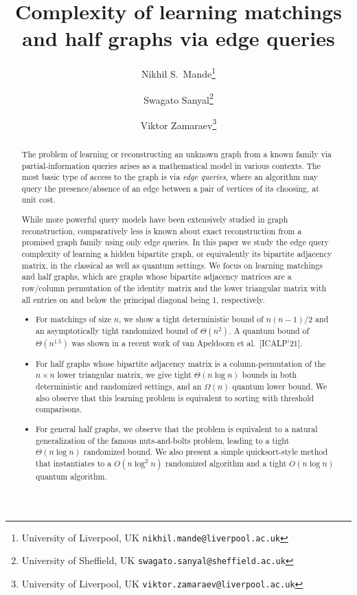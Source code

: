 \documentclass[11pt]{article}
\title{Complexity of learning matchings and half graphs via edge queries}
\author{Nikhil S.~Mande\thanks{University of Liverpool, UK {\tt nikhil.mande@liverpool.ac.uk}}
\and 
Swagato Sanyal\thanks{University of Sheffield, UK {\tt swagato.sanyal@sheffield.ac.uk}
}
\and
Viktor Zamaraev\thanks{University of Liverpool, UK {\tt viktor.zamaraev@liverpool.ac.uk}
}
}
\date{}
\begin{document}
\maketitle

\begin{abstract}
    The problem of learning or reconstructing an unknown graph from a known family via partial-information queries arises as a mathematical model in various contexts.
    The most basic type of access to the graph is via \emph{edge queries}, where an algorithm may query the presence/absence of an edge between a pair of vertices of its choosing, at unit cost.

    While more powerful query models have been extensively studied in graph reconstruction, comparatively less is known about exact reconstruction from a promised graph family using only edge queries. In this paper we study the edge query complexity of learning a hidden bipartite graph, or equivalently its bipartite adjacency matrix, in the classical as well as quantum settings.
    We focus on learning matchings and half graphs, which are graphs whose bipartite adjacency matrices are a row/column permutation of the identity matrix and the lower triangular matrix with all entries on and below the principal diagonal being 1, respectively.
    \begin{itemize}
        \item For matchings of size $n$, we show a tight deterministic bound of $n(n-1)/2$ and an asymptotically tight randomized bound of $\Theta(n^2)$. A quantum bound of $\Theta(n^{1.5})$ was shown in a recent work of van Apeldoorn et al.~[ICALP'21].

        \item For half graphs whose bipartite adjacency matrix is a column-permutation of the $n \times n$ lower triangular matrix,
        we give tight $\Theta(n \log n)$ bounds in both deterministic and randomized settings, and an $\Omega(n)$ quantum lower bound. 
        We also observe that this learning problem is equivalent to sorting with threshold comparisons. 

        \item For general half graphs, 
        we observe that the problem is equivalent to a natural generalization of the famous nuts-and-bolts problem, leading to a tight $\Theta(n \log n)$ randomized bound.
        We also present a simple quicksort-style method that instantiates to a $O(n \log^2 n)$ randomized algorithm and a tight $O(n \log n)$ quantum algorithm.
    \end{itemize}
\end{abstract}
\end{document}
